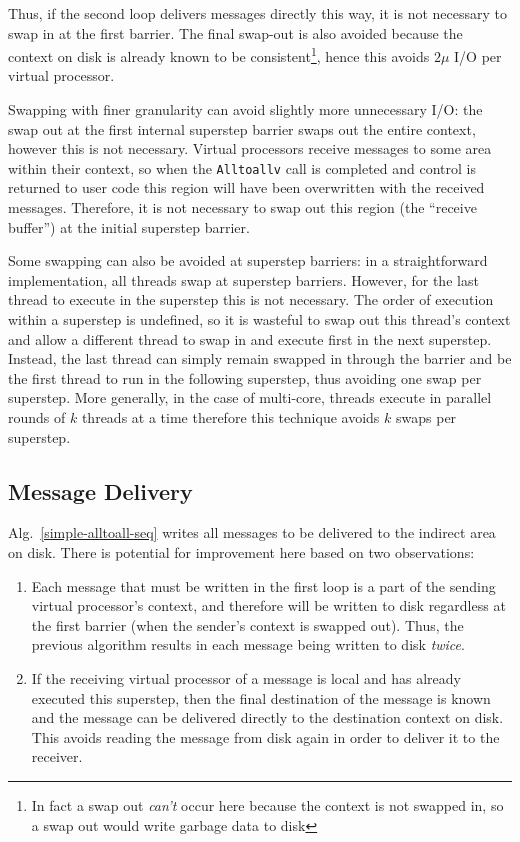 \documentclass[12pt]{carletoncsthesis}
\begin{document}
Thus, if the second loop delivers messages directly this way, it is not
necessary to swap in at the first barrier.  The final swap-out is also avoided
because the context on disk is already known to be consistent\footnote{In
fact a swap out {\em can't} occur here because the context is not swapped
in, so a swap out would write garbage data to disk}, hence this avoids
$2\mu$ I/O per virtual processor.

Swapping with finer granularity can avoid slightly more unnecessary I/O: the
swap out at the first internal superstep barrier swaps out the entire context,
however this is not necessary.  Virtual processors receive messages to some
area within their context, so when the {\tt Alltoallv} call is completed and
control is returned to user code this region will have been overwritten with
the received messages.  Therefore, it is not necessary to swap out this region
(the ``receive buffer'') at the initial superstep barrier.

Some swapping can also be avoided at superstep barriers: in a straightforward
implementation, all threads swap at superstep barriers.  However, for the
last thread to execute in the superstep this is not necessary.  The order
of execution within a superstep is undefined, so it is wasteful to swap out
this thread's context and allow a different thread to swap in and execute
first in the next superstep.  Instead, the last thread can simply remain
swapped in through the barrier and be the first thread to run in the following
superstep, thus avoiding one swap per superstep.  More generally, in the case
of multi-core, threads execute in parallel rounds of $k$ threads at a time
therefore this technique avoids $k$ swaps per superstep.

\subsection{Message Delivery}
\label{pems1_delivery}


Alg.~\ref{simple-alltoall-seq} writes all messages to be delivered to the
indirect area on disk.  There is potential for improvement here based on two
observations:
\begin{enumerate} 
\item Each message that must be written in the first loop is a part of the
sending virtual processor's context, and therefore will be written to disk
regardless at the first barrier (when the sender's context is swapped out).
Thus, the previous algorithm results in each message being written to disk
{\em twice}.
\item If the receiving virtual processor of a message is local and has already
executed this superstep, then the final destination of the message is known
and the message can be delivered directly to the destination context on disk.
This avoids reading the message from disk again in order to deliver it to
the receiver.
\end{enumerate}
\end{document}
